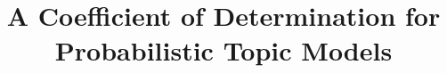 \documentclass[conference,final,]{IEEEtran}
\begin{document}
%
\title{A Coefficient of Determination for Probabilistic Topic Models}


\author{










}


%
\end{document}
